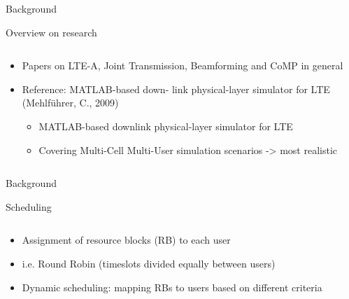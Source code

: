 \documentclass[xcolor={cmyk}]{beamer}
\begin{document}
 \begin{frame}{Background}
	 \begin{block}{Overview on research}
	 	\begin{columns}
			\begin{column}{.9\textwidth}
				\begin{itemize}
					\item Papers on LTE-A, Joint Transmission, Beamforming and CoMP in general
					\item Reference: MATLAB-based down-
link physical-layer simulator for LTE (Mehlführer, C., 2009)
					\begin{itemize}
						\item MATLAB-based downlink physical-layer simulator for LTE
						\item Covering Multi-Cell Multi-User simulation scenarios -> most realistic
					\end{itemize}
				\end{itemize}
			\end{column}
		\end{columns}
	 \end{block}
 \end{frame}
 
 
 \begin{frame}{Background}
 	\begin{block}{Scheduling}
		\begin{columns}
			\begin{column}{.9\textwidth}
				\begin{itemize}
					\item Assignment of resource blocks (RB) to each user
					\item i.e. Round Robin (timeslots divided equally between users)
					\item Dynamic scheduling: mapping RBs to users based on different criteria
				\end{itemize}
			\end{column}
		\end{columns}
	 \end{block}
 \end{frame}
\end{document}
